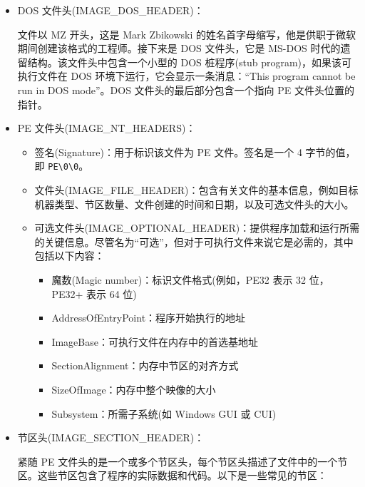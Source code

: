 \begin{itemize}
\item 
DOS 文件头(IMAGE\_DOS\_HEADER)：

文件以 MZ 开头，这是 Mark Zbikowski 的姓名首字母缩写，他是供职于微软期间创建该格式的工程师。接下来是 DOS 文件头，它是 MS-DOS 时代的遗留结构。该文件头中包含一个小型的 DOS 桩程序(stub program)，如果该可执行文件在 DOS 环境下运行，它会显示一条消息：“This program cannot be run in DOS mode”。DOS 文件头的最后部分包含一个指向 PE 文件头位置的指针。

\item 
PE 文件头(IMAGE\_NT\_HEADERS)：

\begin{itemize}
\item 
签名(Signature)：用于标识该文件为 PE 文件。签名是一个 4 字节的值，即 \verb|PE\0\0|。

\item 
文件头(IMAGE\_FILE\_HEADER)：包含有关文件的基本信息，例如目标机器类型、节区数量、文件创建的时间和日期，以及可选文件头的大小。

\item 
可选文件头(IMAGE\_OPTIONAL\_HEADER)：提供程序加载和运行所需的关键信息。尽管名为“可选”，但对于可执行文件来说它是必需的，其中包括以下内容：

\begin{itemize}
\item 
魔数(Magic number)：标识文件格式(例如，PE32 表示 32 位，PE32+ 表示 64 位)

\item 
AddressOfEntryPoint：程序开始执行的地址

\item 
ImageBase：可执行文件在内存中的首选基地址

\item 
SectionAlignment：内存中节区的对齐方式

\item 
SizeOfImage：内存中整个映像的大小

\item 
Subsystem：所需子系统(如 Windows GUI 或 CUI)
\end{itemize}

\end{itemize}

\item 
节区头(IMAGE\_SECTION\_HEADER)：

紧随 PE 文件头的是一个或多个节区头，每个节区头描述了文件中的一个节区。这些节区包含了程序的实际数据和代码。以下是一些常见的节区：


\end{itemize}
